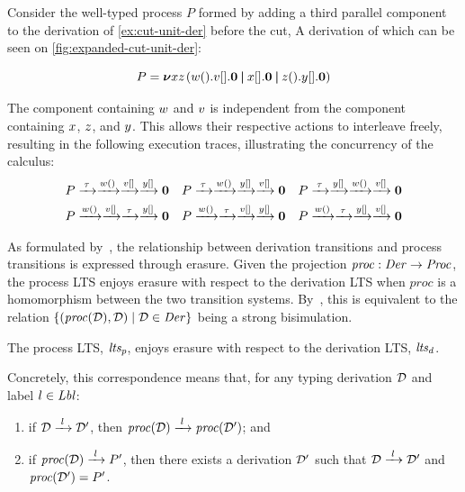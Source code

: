 \begin{example}\label{ex:expanded-cut-unit-execution}
\begin{highlight}
Consider the well-typed process $P$ formed by adding a third parallel component to the derivation of \cref{ex:cut-unit-der} before the cut, A derivation of which can be seen on \cref{fig:expanded-cut-unit-der}:

\[P = {\boldsymbol{\nu}{xz}\mspace{2mu}}{({{w()}{.}{{v[]}{.}\mathbf{0}}} \mathbin{\boldsymbol{|}} {{x[]}{.}\mathbf{0}} \mathbin{\boldsymbol{|}} {{z()}{.}{{y[]}{.}\mathbf{0}}})}\]

The component containing $w$ and $v$ is independent from the component containing $x$, $z$, and $y$. This allows their respective actions to interleave freely, resulting in the following execution traces, illustrating the concurrency of the calculus:
\begin{align*}
  \phl{P} &\lto{\tau}\lto{\lwait{w}}\lto{\lsend{v}{}}\lto{\lsend{y}{}}\phl{\nil} &
  \phl{P} &\lto{\tau}\lto{\lwait{w}}\lto{\lsend{y}{}}\lto{\lsend{v}{}}\phl{\nil} &
  \phl{P} &\lto{\tau}\lto{\lsend{y}{}}\lto{\lwait{w}}\lto{\lsend{v}{}}\phl{\nil} \\
  \phl{P} &\lto{\lwait{w}{}}\lto{\lsend{v}{}}\lto{\tau}\lto{\lsend{y}{}}\phl{\nil} &
  \phl{P} &\lto{\lwait{w}{}}\lto{\tau}\lto{\lsend{v}{}}\lto{\lsend{y}{}}\phl{\nil} &
  \phl{P} &\lto{\lwait{w}{}}\lto{\tau}\lto{\lsend{y}{}}\lto{\lsend{v}{}}\phl{\nil}
\end{align*}
\end{highlight}
\end{example}

As formulated by~\citet{abs-2106-11818}, the relationship between derivation transitions and process transitions is expressed through erasure. Given the projection $\mathit{proc} : \mathit{Der} \to \mathit{Proc}$, the process LTS enjoys erasure with respect to the derivation LTS when $\mathit{proc}$ is a homomorphism between the two transition systems. By~\citet[Fact~4.6]{abs-2106-11818}, this is equivalent to the relation $\{(\mathit{proc}(\mathcal{D}), \mathcal{D}) \mid \mathcal{D} \in \mathit{Der}\}$ being a strong bisimulation.

\begin{theorem}\label{thm:operational-correspondence}
The process LTS, $\mathit{lts_{p}}$, enjoys erasure with respect to the derivation LTS, $\mathit{lts_{d}}$.
\end{theorem}

Concretely, this correspondence means that, for any typing derivation $\mathcal{D}$ and label $l \in \mathit{Lbl}$:
\begin{enumerate}
\item if $\der{D} \lto{l} \der{D}'$, then $\mathit{proc}(\der{D}) \lto{l} \mathit{proc}(\der{D}')$; and
\item if $\mathit{proc}(\der{D}) \lto{l} P'$, then there exists a derivation $\mathcal{D}'$ such that $\der{D} \lto{l} \der{D}'$ and $\mathit{proc}(\mathcal{D}') = P'$.
\end{enumerate}

